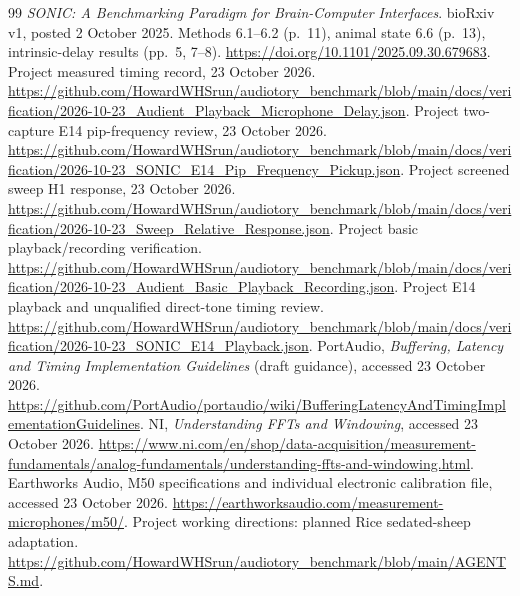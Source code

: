 \documentclass[11pt,letterpaper]{article}
\begin{document}
\begingroup\footnotesize
\begin{thebibliography}{99}
 \emph{SONIC: A Benchmarking Paradigm for Brain-Computer Interfaces}.
bioRxiv v1, posted 2 October 2025. Methods 6.1--6.2 (p.\ 11), animal state 6.6
(p.\ 13), intrinsic-delay results (pp.\ 5, 7--8).
\url{https://doi.org/10.1101/2025.09.30.679683}.
 Project measured timing record, 23 October 2026.
\url{https://github.com/HowardWHSrun/audiotory_benchmark/blob/main/docs/verification/2026-10-23_Audient_Playback_Microphone_Delay.json}.
 Project two-capture E14 pip-frequency review, 23 October 2026.
\url{https://github.com/HowardWHSrun/audiotory_benchmark/blob/main/docs/verification/2026-10-23_SONIC_E14_Pip_Frequency_Pickup.json}.
 Project screened sweep H1 response, 23 October 2026.
\url{https://github.com/HowardWHSrun/audiotory_benchmark/blob/main/docs/verification/2026-10-23_Sweep_Relative_Response.json}.
 Project basic playback/recording verification.
\url{https://github.com/HowardWHSrun/audiotory_benchmark/blob/main/docs/verification/2026-10-23_Audient_Basic_Playback_Recording.json}.
 Project E14 playback and unqualified direct-tone timing review.
\url{https://github.com/HowardWHSrun/audiotory_benchmark/blob/main/docs/verification/2026-10-23_SONIC_E14_Playback.json}.
 PortAudio, \emph{Buffering, Latency and Timing Implementation Guidelines}
(draft guidance), accessed 23 October 2026.
\url{https://github.com/PortAudio/portaudio/wiki/BufferingLatencyAndTimingImplementationGuidelines}.
 NI, \emph{Understanding FFTs and Windowing}, accessed 23 October 2026.
\url{https://www.ni.com/en/shop/data-acquisition/measurement-fundamentals/analog-fundamentals/understanding-ffts-and-windowing.html}.
 Earthworks Audio, M50 specifications and individual electronic calibration file,
accessed 23 October 2026. \url{https://earthworksaudio.com/measurement-microphones/m50/}.
 Project working directions: planned Rice sedated-sheep adaptation.
\url{https://github.com/HowardWHSrun/audiotory_benchmark/blob/main/AGENTS.md}.
\end{thebibliography}
\endgroup
\end{document}
